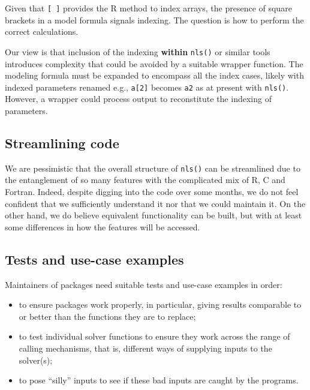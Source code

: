 Given that \texttt{{[}\ {]}} provides the R method to index arrays, the presence of square
brackets in a model
formula signals indexing. The question is how to perform the correct calculations.

Our view is that inclusion of the indexing \textbf{within} \texttt{nls()} or similar tools
introduces complexity that could be avoided by a suitable wrapper function. The
modeling formula must be expanded to encompass all the index cases, likely with
indexed parameters renamed e.g., \texttt{a{[}2{]}} becomes \texttt{a2} as at present with \texttt{nls()}.
However, a wrapper could process output to reconstitute the indexing of parameters.

\hypertarget{streamlining-code}{%
\subsection{Streamlining code}\label{streamlining-code}}

We are pessimistic that the overall structure of \texttt{nls()} can be streamlined due
to the entanglement of so many features with the complicated mix of R, C and
Fortran. Indeed, despite digging into the code over some months, we do not feel
confident that we sufficiently understand it nor that we could maintain it. On
the other hand, we do believe equivalent functionality can be built, but with
at least some differences in how the features will be accessed.

\hypertarget{tests-and-use-case-examples}{%
\subsection{Tests and use-case examples}\label{tests-and-use-case-examples}}

Maintainers of packages need suitable tests and use-case examples in order:

\begin{itemize}
\tightlist
\item
  to ensure packages work properly, in particular, giving
  results comparable to or better than the functions they are to replace;
\item
  to test individual solver functions to ensure they work across the range of
  calling mechanisms, that is, different ways of supplying inputs to the solver(s);
\item
  to pose ``silly'' inputs to see if these bad inputs are caught by the programs.
\end{itemize}

